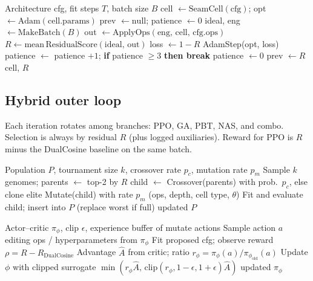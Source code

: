 \begin{algorithm}[t]
\caption{FitCell (inner loop)}
\label{alg:fit}
\begin{algorithmic}[1]
\Require Architecture cfg, fit steps $T$, batch size $B$
\State cell $\gets \mathrm{SeamCell}(\mathrm{cfg})$; opt $\gets \mathrm{Adam}(\mathrm{cell.params})$
\State prev $\gets \mathrm{null}$; patience $\gets 0$
  \State ideal, eng $\gets \mathrm{MakeBatch}(B)$
  \State out $\gets \mathrm{ApplyOps}(\mathrm{eng},\,\mathrm{cell},\,\mathrm{cfg.ops})$
  \State $R \gets \mathrm{mean}\,\mathrm{ResidualScore}(\mathrm{ideal},\,\mathrm{out})$
  \State loss $\gets 1-R$
   AdamStep(opt, loss)
  \EndIf
    \State patience $\gets$ patience $+1$; \textbf{if} patience $\ge 3$ \textbf{then break}
  \Else
    \State patience $\gets 0$
  \EndIf
  \State prev $\gets R$
\EndFor
\State \Return cell, $R$
\end{algorithmic}
\end{algorithm}

\subsection{Hybrid outer loop}
\label{sec:hybrid}

Each iteration rotates among branches: PPO, GA, PBT, NAS, and combo.
Selection is always by residual $R$ (plus logged auxiliaries).
Reward for PPO is $R$ minus the DualCosine baseline on the same batch.

\begin{algorithm}[t]
\caption{GA tournament step}
\label{alg:ga}
\begin{algorithmic}[1]
\Require Population $P$, tournament size $k$, crossover rate $p_c$, mutation rate $p_m$
\State Sample $k$ genomes; parents $\gets$ top-2 by $R$
\State child $\gets$ Crossover(parents) with prob.\ $p_c$, else clone elite
\State Mutate(child) with rate $p_m$ (ops, depth, cell type, $\theta$)
\State Fit and evaluate child; insert into $P$ (replace worst if full)
\State \Return updated $P$
\end{algorithmic}
\end{algorithm}

\begin{algorithm}[t]
\caption{PPO architecture update}
\label{alg:ppo}
\begin{algorithmic}[1]
\Require Actor--critic $\pi_\phi$, clip $\epsilon$, experience buffer of mutate actions
\State Sample action $a$ editing ops / hyperparameters from $\pi_\phi$
\State Fit proposed cfg; observe reward $\rho = R - R_{\mathrm{DualCosine}}$
\State Advantage $\hat{A}$ from critic; ratio $r_\phi = \pi_\phi(a)/\pi_{\phi_{\mathrm{old}}}(a)$
\State Update $\phi$ with clipped surrogate $\min(r_\phi\hat{A},\,\mathrm{clip}(r_\phi,1-\epsilon,1+\epsilon)\hat{A})$
\State \Return updated $\pi_\phi$
\end{algorithmic}
\end{algorithm}

